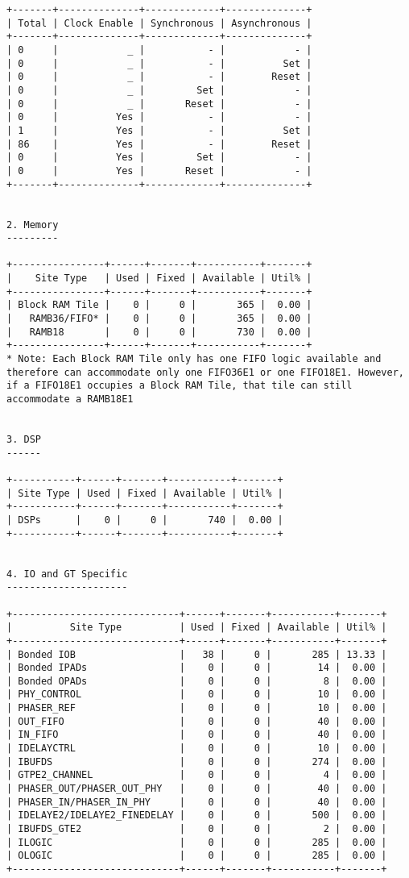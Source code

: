 \documentclass [a4paper, 12pt]{article}
\begin{document}
\begin{lstlisting}[breaklines, basicstyle=\tiny]
+-------+--------------+-------------+--------------+
| Total | Clock Enable | Synchronous | Asynchronous |
+-------+--------------+-------------+--------------+
| 0     |            _ |           - |            - |
| 0     |            _ |           - |          Set |
| 0     |            _ |           - |        Reset |
| 0     |            _ |         Set |            - |
| 0     |            _ |       Reset |            - |
| 0     |          Yes |           - |            - |
| 1     |          Yes |           - |          Set |
| 86    |          Yes |           - |        Reset |
| 0     |          Yes |         Set |            - |
| 0     |          Yes |       Reset |            - |
+-------+--------------+-------------+--------------+


2. Memory
---------

+----------------+------+-------+-----------+-------+
|    Site Type   | Used | Fixed | Available | Util% |
+----------------+------+-------+-----------+-------+
| Block RAM Tile |    0 |     0 |       365 |  0.00 |
|   RAMB36/FIFO* |    0 |     0 |       365 |  0.00 |
|   RAMB18       |    0 |     0 |       730 |  0.00 |
+----------------+------+-------+-----------+-------+
* Note: Each Block RAM Tile only has one FIFO logic available and therefore can accommodate only one FIFO36E1 or one FIFO18E1. However, if a FIFO18E1 occupies a Block RAM Tile, that tile can still accommodate a RAMB18E1


3. DSP
------

+-----------+------+-------+-----------+-------+
| Site Type | Used | Fixed | Available | Util% |
+-----------+------+-------+-----------+-------+
| DSPs      |    0 |     0 |       740 |  0.00 |
+-----------+------+-------+-----------+-------+


4. IO and GT Specific
---------------------

+-----------------------------+------+-------+-----------+-------+
|          Site Type          | Used | Fixed | Available | Util% |
+-----------------------------+------+-------+-----------+-------+
| Bonded IOB                  |   38 |     0 |       285 | 13.33 |
| Bonded IPADs                |    0 |     0 |        14 |  0.00 |
| Bonded OPADs                |    0 |     0 |         8 |  0.00 |
| PHY_CONTROL                 |    0 |     0 |        10 |  0.00 |
| PHASER_REF                  |    0 |     0 |        10 |  0.00 |
| OUT_FIFO                    |    0 |     0 |        40 |  0.00 |
| IN_FIFO                     |    0 |     0 |        40 |  0.00 |
| IDELAYCTRL                  |    0 |     0 |        10 |  0.00 |
| IBUFDS                      |    0 |     0 |       274 |  0.00 |
| GTPE2_CHANNEL               |    0 |     0 |         4 |  0.00 |
| PHASER_OUT/PHASER_OUT_PHY   |    0 |     0 |        40 |  0.00 |
| PHASER_IN/PHASER_IN_PHY     |    0 |     0 |        40 |  0.00 |
| IDELAYE2/IDELAYE2_FINEDELAY |    0 |     0 |       500 |  0.00 |
| IBUFDS_GTE2                 |    0 |     0 |         2 |  0.00 |
| ILOGIC                      |    0 |     0 |       285 |  0.00 |
| OLOGIC                      |    0 |     0 |       285 |  0.00 |
+-----------------------------+------+-------+-----------+-------+



\end{lstlisting}
\end{document}
